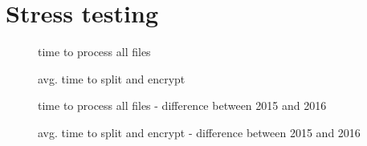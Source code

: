 \section{Stress testing}


\begin{figure}[h]
\centering

\caption{time to process all files}
\end{figure}

\begin{figure}[h]
\centering

\caption{avg. time to split and encrypt}
\end{figure}

\begin{figure}[h]
\centering

\caption{time to process all files - difference between 2015 and 2016}
\end{figure}

\begin{figure}[h]
\centering

\caption{avg. time to split and encrypt - difference between 2015 and 2016}
\end{figure}